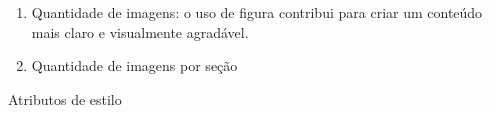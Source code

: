\begin{enumerate}
	\item Quantidade de imagens: o uso de figura contribui para criar um conteúdo mais claro e visualmente agradável.%
	\item Quantidade de imagens por seção %
\end{enumerate}

Atributos de estilo

